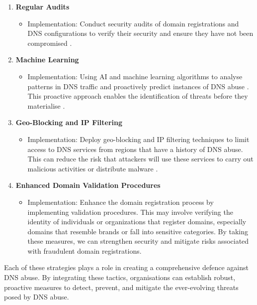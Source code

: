\begin{enumerate}
\begin{itemize}
    \end{itemize}
    \item \textbf{Regular Audits}
    \begin{itemize}
        \item Implementation: Conduct security audits of domain registrations and DNS configurations to verify their security and ensure they have not been compromised \cite{coronado2014auditing}.
    \end{itemize}
    \item \textbf{Machine Learning}
    \begin{itemize}
        \item Implementation: Using AI and machine learning algorithms to analyse patterns in DNS traffic and proactively predict instances of DNS abuse \cite{icannndnssec}. This proactive approach enables the identification of threats before they materialise \cite{tsukerman2019machine}.
    \end{itemize}
    \item \textbf{Geo-Blocking and IP Filtering}
    \begin{itemize}
        \item Implementation: Deploy geo-blocking and IP filtering techniques to limit access to DNS services from regions that have a history of DNS abuse. This can reduce the risk that attackers will use these services to carry out malicious activities or distribute malware \cite{meeseedited}.
    \end{itemize}
    \item \textbf{Enhanced Domain Validation Procedures}
    \begin{itemize}
        \item Implementation: Enhance the domain registration process by implementing validation procedures. This may involve verifying the identity of individuals or organizations that register domains, especially domains that resemble brands or fall into sensitive categories. By taking these measures, we can strengthen security and mitigate risks associated with fraudulent domain registrations.
    \end{itemize}
\end{enumerate}

Each of these strategies plays a role in creating a comprehensive defence against DNS abuse. By integrating these tactics, organisations can establish robust, proactive measures to detect, prevent, and mitigate the ever-evolving threats posed by DNS abuse.

